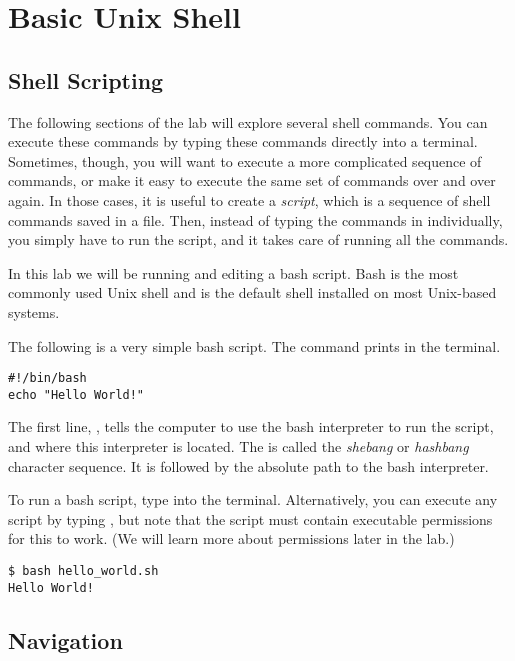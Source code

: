 \section*{Basic Unix Shell}%
\subsection*{Shell Scripting}%
The following sections of the lab will explore several shell commands.
You can execute these commands by typing these commands directly into a terminal.
Sometimes, though, you will want to execute a more complicated sequence of commands, or make it easy to execute the same set of commands over and over again.
In those cases, it is useful to create a \emph{script}, which is a sequence of shell commands saved in a file.
Then, instead of typing the commands in individually, you simply have to run the script, and it takes care of running all the commands.

In this lab we will be running and editing a bash script.
Bash is the most commonly used Unix shell and is the default shell installed on most Unix-based systems.

The following is a very simple bash script.
The command  prints  in the terminal.
\begin{lstlisting}
#!/bin/bash
echo "Hello World!"
\end{lstlisting}

The first line, , tells the computer to use the bash interpreter to run the script, and where this interpreter is located.
The \li{#\!} is called the \emph{shebang} or \emph{hashbang} character sequence.
It is followed by the absolute path to the bash interpreter.

To run a bash script, type  into the terminal.
Alternatively, you can execute any script by typing , but note that the script must contain executable permissions for this to work.
(We will learn more about permissions later in the lab.)
\begin{lstlisting}
$ bash hello_world.sh
Hello World!
\end{lstlisting}

\subsection*{Navigation} %

